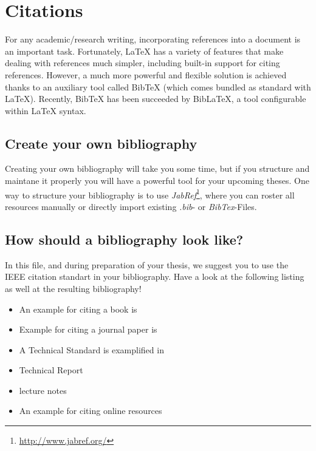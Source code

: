\chapter{Citations}
For any academic/research writing, incorporating references into a document is an important task. Fortunately, LaTeX has a variety of features that make dealing with references much simpler, including built-in support for citing references. However, a much more powerful and flexible solution is achieved thanks to an auxiliary tool called BibTeX (which comes bundled as standard with LaTeX). Recently, BibTeX has been succeeded by BibLaTeX, a tool configurable within LaTeX syntax.

\section{Create your own bibliography}
Creating your own bibliography will take you some time, but if you structure and maintane it properly you will have a powerful tool for your upcoming theses. One way to structure your bibliography is to use \emph{JabRef}\footnote{\url{http://www.jabref.org/}}, where you can roster all resources manually or directly import existing \emph{.bib}- or \emph{BibTex}-Files.

\section{How should a bibliography look like?}
In this file, and during preparation of your thesis, we suggest you to use the IEEE citation standart in your bibliography. Have a look at the following listing as well at the resulting bibliography!

\begin{itemize}
	\item An example for citing a book is \cite{MowlaeePejman2016}
	\item Example for citing a journal paper is \cite{MayerEtAl2017}
	\item A Technical Standard is examplified in \cite{Prechtl2006}
	\item Technical Report \cite{Mathworks2017}
	\item lecture notes \cite{Okorn2017}
	\item An example for citing online resources \cite{Goeschka}
	
\end{itemize}